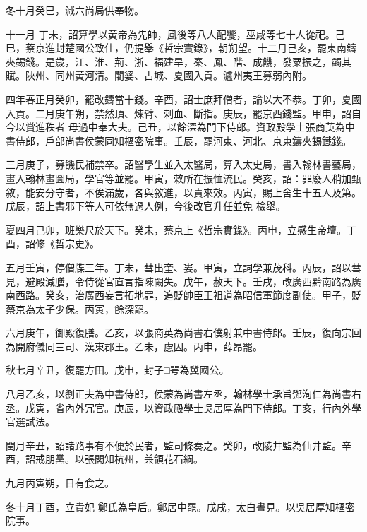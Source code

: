\begin{pinyinscope}
 冬十月癸巳，減六尚局供奉物。



 十一月
 丁未，詔算學以黃帝為先師，風後等八人配饗，巫咸等七十人從祀。己巳，蔡京進封楚國公致仕，仍提舉《哲宗實錄》，朝朔望。十二月己亥，罷東南鑄夾錫錢。是歲，江、淮、荊、浙、福建旱，秦、鳳、階、成饑，發粟振之，蠲其賦。陜州、同州黃河清。闍婆、占城、夏國入貢。瀘州夷王募弱內附。



 四年春正月癸卯，罷改鑄當十錢。辛酉，詔士庶拜僧者，論以大不恭。丁卯，夏國入貢。二月庚午朔，禁然頂、煉臂、刺血、斷指。庚辰，罷京西錢監。甲申，詔自今以賞進秩者
 毋過中奉大夫。己丑，以餘深為門下侍郎。資政殿學士張商英為中書侍郎，戶部尚書侯蒙同知樞密院事。壬辰，罷河東、河北、京東鑄夾錫鐵錢。



 三月庚子，募饑民補禁卒。詔醫學生並入太醫局，算入太史局，書入翰林書藝局，畫入翰林畫圖局，學官等並罷。甲寅，敕所在振恤流民。癸亥，詔：罪廢人稍加甄敘，能安分守者，不俟滿歲，各與敘進，以責來效。丙寅，賜上舍生十五人及第。戊辰，詔上書邪下等人可依無過人例，今後改官升任並免
 檢舉。



 夏四月己卯，班樂尺於天下。癸未，蔡京上《哲宗實錄》。丙申，立感生帝壇。丁酉，詔修《哲宗史》。



 五月壬寅，停僧牒三年。丁未，彗出奎、婁。甲寅，立詞學兼茂科。丙辰，詔以彗見，避殿減膳，令侍從官直言指陳闕失。戊午，赦天下。壬戌，改廣西黔南路為廣南西路。癸亥，治廣西妄言拓地罪，追貶帥臣王祖道為昭信軍節度副使。甲子，貶蔡京為太子少保。丙寅，餘深罷。



 六月庚午，御殿復膳。乙亥，以張商英為尚書右僕射兼中書侍郎。壬辰，復向宗回
 為開府儀同三司、漢東郡王。乙未，慮囚。丙申，薛昂罷。



 秋七月辛丑，復罷方田。戊申，封子□咢為冀國公。



 八月乙亥，以劉正夫為中書侍郎，侯蒙為尚書左丞，翰林學士承旨鄧洵仁為尚書右丞。戊寅，省內外冗官。庚辰，以資政殿學士吳居厚為門下侍郎。丁亥，行內外學官選試法。



 閏月辛丑，詔諸路事有不便於民者，監司條奏之。癸卯，改陵井監為仙井監。辛酉，詔戒朋黨。以張閣知杭州，兼領花石綱。



 九月丙寅朔，日有食之。



 冬十月丁酉，立貴妃
 鄭氏為皇后。鄭居中罷。戊戌，太白晝見。以吳居厚知樞密院事。




\end{pinyinscope}
